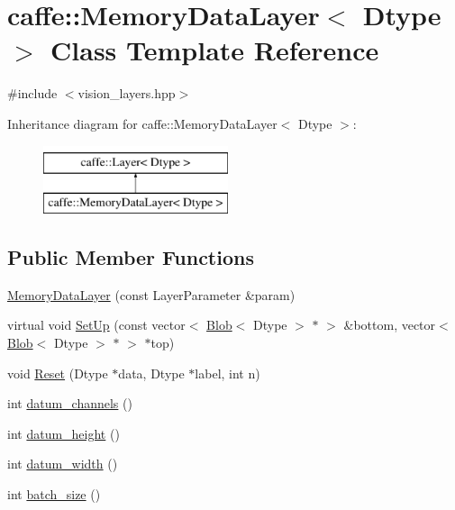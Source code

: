 \hypertarget{classcaffe_1_1_memory_data_layer}{\section{caffe\+:\+:Memory\+Data\+Layer$<$ Dtype $>$ Class Template Reference}
\label{classcaffe_1_1_memory_data_layer}
}


{\ttfamily \#include $<$vision\+\_\+layers.\+hpp$>$}

Inheritance diagram for caffe\+:\+:Memory\+Data\+Layer$<$ Dtype $>$\+:\begin{figure}[H]
\begin{center}
\leavevmode
\includegraphics[height=2.000000cm]{classcaffe_1_1_memory_data_layer}
\end{center}
\end{figure}
\subsection*{Public Member Functions}
\begin{DoxyCompactItemize}
\item 
\hyperlink{classcaffe_1_1_memory_data_layer_a9bf012786068bfe846694af129a6736f}{Memory\+Data\+Layer} (const Layer\+Parameter \&param)
\item 
virtual void \hyperlink{classcaffe_1_1_memory_data_layer_a276f9246a9ff0e6f016dfb54f00da88d}{Set\+Up} (const vector$<$ \hyperlink{classcaffe_1_1_blob}{Blob}$<$ Dtype $>$ $\ast$ $>$ \&bottom, vector$<$ \hyperlink{classcaffe_1_1_blob}{Blob}$<$ Dtype $>$ $\ast$ $>$ $\ast$top)
\item 
void \hyperlink{classcaffe_1_1_memory_data_layer_aeaa745c4fe3a957b973bf94dca6a5f2b}{Reset} (Dtype $\ast$data, Dtype $\ast$label, int n)
\item 
int \hyperlink{classcaffe_1_1_memory_data_layer_ab8d57e0648185469a8883fd77cce5c2c}{datum\+\_\+channels} ()
\item 
int \hyperlink{classcaffe_1_1_memory_data_layer_aa60a2e9729fdd79ec46daaa3ace1717d}{datum\+\_\+height} ()
\item 
int \hyperlink{classcaffe_1_1_memory_data_layer_addc2b736e9e4a80e360c86ded1bc01de}{datum\+\_\+width} ()
\item 
int \hyperlink{classcaffe_1_1_memory_data_layer_a06bfb6d06f61db11699a6b3ce7b1ee53}{batch\+\_\+size} ()
\end{DoxyCompactItemize}
